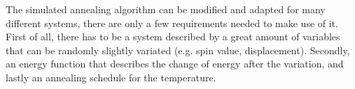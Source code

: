 The simulated annealing algorithm can be modified and adapted for many different systems, there are only a few requirements needed to make use of it. First of all, there has to be a system described by a great amount of variables that can be randomly slightly variated (e.g. spin value, displacement). Secondly, an energy function that describes the change of energy after the variation, and lastly an annealing schedule for the temperature.



%
%
%
%

